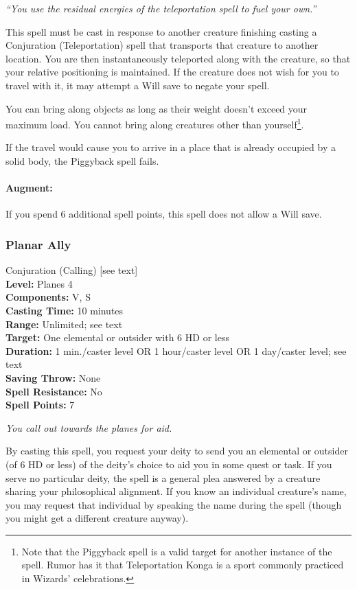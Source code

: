 \emph{``You use the residual energies of the teleportation spell to fuel your own.''}

This spell must be cast in response to another creature finishing casting a Conjuration (Teleportation) spell that transports that creature to another location. You are then instantaneously teleported along with the creature, so that your relative positioning is maintained. If the creature does not wish for you to travel with it, it may attempt a Will save to negate your spell.

You can bring along objects as long as their weight doesn't exceed your maximum load. You cannot bring along creatures other than yourself\footnote{Note that the Piggyback spell is a valid target for another instance of the spell. Rumor has it that Teleportation Konga is a sport commonly practiced in Wizards' celebrations.}.

If the travel would cause you to arrive in a place that is already occupied by a solid body, the Piggyback spell fails.

\paragraph{Augment:} If you spend 6 additional spell points, this spell does not allow a Will save.
\subsubsection{Planar Ally}
\label{Spell:PlanarAlly}
Conjuration (Calling) [see text]
\\ \textbf{Level:} Planes 4
\\ \textbf{Components:} V, S
\\ \textbf{Casting Time:} 10 minutes
\\ \textbf{Range:} Unlimited; see text
\\ \textbf{Target:} One elemental or outsider with 6 HD or less
\\ \textbf{Duration:} 1 min./caster level OR 1 hour/caster level OR 1 day/caster level; see text
\\ \textbf{Saving Throw:} None
\\ \textbf{Spell Resistance:} No
\\ \textbf{Spell Points:} 7

\emph{You call out towards the planes for aid.}

By casting this spell, you request your deity to send you an elemental or outsider (of 6 HD or less) of the deity's choice to aid you in some quest or task. 
If you serve no particular deity, the spell is a general plea answered by a creature sharing your philosophical alignment. 
If you know an individual creature's name, you may request that individual by speaking the name during the spell (though you might get a different creature anyway).


